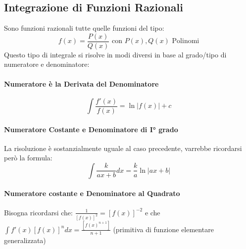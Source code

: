 \documentclass[12pt, a4paper, openany]{book}
\begin{document}
\subsection{Integrazione di Funzioni Razionali}
Sono funzioni razionali tutte quelle funzioni del tipo:
$$f(x)=\frac{P(x)}{Q(x)} \text{ con } P(x),Q(x) \text{ Polinomi} $$
Questo tipo di integrale si risolve in modi diversi in base al grado/tipo di numeratore e denominatore:
\paragraph*{Numeratore è la Derivata del Denominatore}
$$\int \frac{f'(x)}{f(x)} = \ln|f(x)|+ c$$
\paragraph*{Numeratore Costante e Denominatore di I° grado}
La risoluzione è sostanzialmente uguale al caso precedente, varrebbe ricordarsi però la formula:
$$\int\frac{k}{ax+b} dx = \frac{k}{a} \ln|ax+b|$$

\paragraph*{Numeratore costante e Denominatore al Quadrato}
Bisogna ricordarsi che:
$\frac{1}{[f(x)]^2} = [f(x)]^{-2}$ e che 
$\int f'(x)[f(x)]^n dx = \frac{[f(x)^{n+1}]}{n+1}$ (primitiva di funzione elementare generalizzata)

\end{document}
